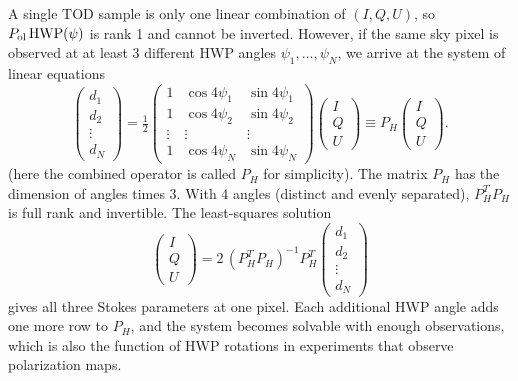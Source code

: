 \documentclass[a4paper,11pt]{article}
\begin{document}
A single TOD sample is only one linear combination of $(I,Q,U)$, so $P_{\rm ol}\,\mathrm{HWP}(\psi)$ is rank 1 and cannot be inverted. However, if the same sky pixel is observed at at least 3 different HWP angles $\psi_1,\dots,\psi_N$, we arrive at the system of linear equations
\begin{equation}
    \begin{pmatrix}d_1\\d_2\\ \vdots \\ d_N\end{pmatrix}
    = \tfrac{1}{2}
    \begin{pmatrix}
        1 & \cos4\psi_1 & \sin4\psi_1\\
        1 & \cos4\psi_2 & \sin4\psi_2\\
        \vdots & \vdots & \vdots\\
        1 & \cos4\psi_N & \sin4\psi_N
    \end{pmatrix}
    \begin{pmatrix}I\\Q\\U\end{pmatrix}
    \equiv P_H
    \begin{pmatrix}I\\Q\\U\end{pmatrix}.
    \label{eq:pol-stack}
\end{equation}
(here the combined operator is called $P_H$ for simplicity).
The matrix $P_H$ has the dimension of angles times 3. With 4 angles (distinct and evenly separated), $P_H^T P_H$ is full rank and invertible. The least-squares solution
\begin{equation}
    \begin{pmatrix}I\\Q\\U\end{pmatrix}
    = 2\,(P_H^T P_H)^{-1} P_H^T
    \begin{pmatrix}d_1\\d_2\\ \vdots \\ d_N\end{pmatrix}
\end{equation}
gives all three Stokes parameters at one pixel. Each additional HWP angle adds one more row to $P_H$, and the system becomes solvable with enough observations, which is also the function of HWP rotations in experiments that observe polarization maps.
\end{document}
